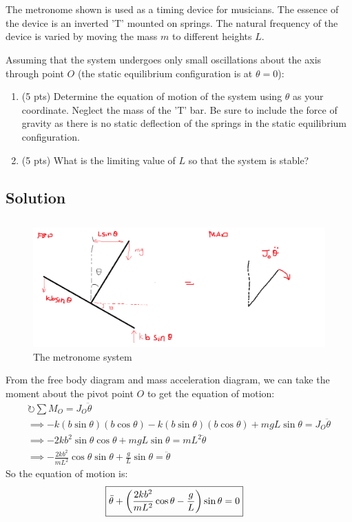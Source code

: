 \section{}
The metronome shown is used as a timing device for musicians. The essence of the device is an
inverted 'T' mounted on springs. The natural frequency of the device is varied by moving the mass
$m$ to different heights $L$.

Assuming that the system undergoes only small oscillations about the axis through point $O$ (the
static equilibrium configuration is at $\theta = 0$):
\begin{enumerate}[label=(\alph*)]
    \item (5 pts) Determine the equation of motion of the system using $\theta$ as your coordinate.
        Neglect the mass of the 'T' bar. Be sure to include the force of gravity as there is no
        static deflection of the springs in the static equilibrium configuration.
    \item (5 pts) What is the limiting value of $L$ so that the system is stable?
\end{enumerate}

\subsection*{Solution}  
\subsection{}
\begin{figure}[h]
    \centering
    \includegraphics[width=0.7\linewidth]{Questions/Figures/q1 fbd.png}
    \caption{The metronome system}
    \label{fig:q1_fbd-png}
\end{figure}
From the free body diagram and mass acceleration diagram, we can take the moment about the 
pivot point $O$ to get the equation of motion:
\begin{gather*}
    \circlearrowright \sum M_O = J_O \ddot{\theta} \\
    \implies -k (b\sin\theta) (b \cos \theta) - k (b\sin\theta)(b \cos \theta) + mg L \sin \theta = J_O \ddot{\theta} \\
    \implies -2kb^2 \sin\theta \cos\theta + mgL \sin\theta = mL^2 \ddot{\theta} \\
    \implies -\frac{2kb^2}{mL^2}\cos\theta \sin\theta + \frac{g}{L} \sin\theta = \ddot{\theta}
\end{gather*}
So the equation of motion is:
\begin{align*}
    \Aboxed{\ddot{\theta} + \left(\frac{2kb^2}{mL^2}\cos\theta - \frac{g}{L}\right) \sin\theta &= 0}
\end{align*}
